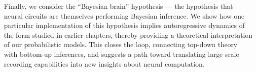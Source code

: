 Finally, we consider the ``Bayesian brain'' hypothesis --- the
hypothesis that neural circuits are themselves performing Bayesian
inference.  We show how one particular implementation of this
hypothesis implies autoregressive dynamics of the form studied
in earlier chapters, thereby providing a theoretical interpretation of
our probabilistic models.  This closes the
loop, connecting top-down theory with bottom-up inferences, and
suggests a path toward translating large scale recording
capabilities into new insights about neural computation.


